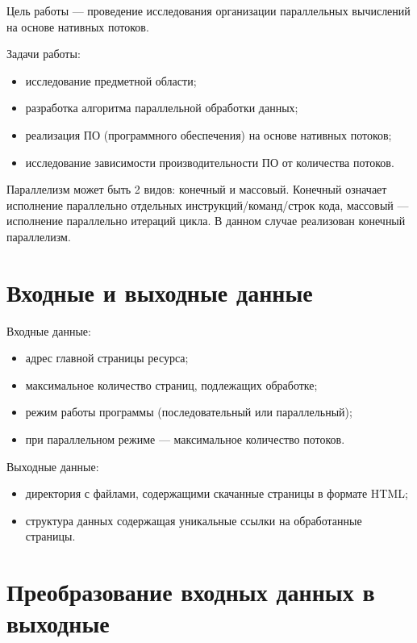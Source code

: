 
Цель работы --- проведение исследования организации параллельных вычислений на основе нативных потоков.

Задачи работы: 
\begin{itemize} 
\item исследование предметной области; 
\item разработка алгоритма параллельной обработки данных; 
\item реализация ПО (программного обеспечения) на основе нативных потоков; 
\item исследование зависимости производительности ПО от количества потоков. 
\end{itemize}

Параллелизм может быть 2 видов: конечный и массовый. Конечный означает исполнение параллельно отдельных инструкций/команд/строк кода, массовый --- исполнение параллельно итераций цикла. В данном случае реализован конечный параллелизм.~\cite{lit1}

\vspace{20mm}
\chapter{Входные и выходные данные}

Входные данные: 
\begin{itemize} 
\item адрес главной страницы ресурса; 
\item максимальное количество страниц, подлежащих обработке; 
\item режим работы программы (последовательный или параллельный);
\item при параллельном режиме --- максимальное количество потоков.
\end{itemize}

Выходные данные: 
\begin{itemize} 
\item директория с файлами, содержащими скачанные страницы в формате HTML; 
\item структура данных содержащая уникальные ссылки на обработанные страницы.
\end{itemize}

\vspace{20mm}
\chapter{Преобразование входных данных в выходные}

